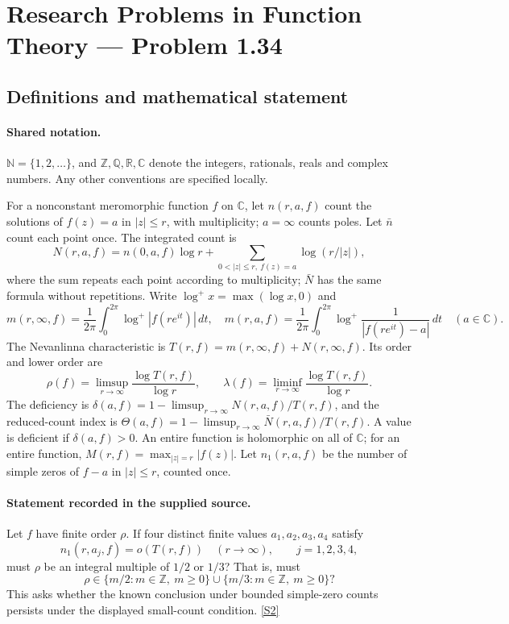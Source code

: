 \documentclass[11pt]{article}
\newcommand{\sref}[2]{\hyperlink{source:#1:#2}{[S#2]}}
\begin{document}
\section{Research Problems in Function Theory — Problem 1.34}\label{statement}

\subsection{Definitions and mathematical statement}

\paragraph{Shared notation.}$\mathbb N=\{1,2,\ldots\}$, and $\mathbb Z,\mathbb Q,\mathbb R,\mathbb C$ denote the integers, rationals, reals and complex numbers. Any other conventions are specified locally.


For a nonconstant meromorphic function $f$ on $\mathbb C$, let $n(r,a,f)$ count the solutions of $f(z)=a$ in $|z|\le r$, with multiplicity; $a=\infty$ counts poles. Let $\bar n$ count each point once. The integrated count is
\[
 N(r,a,f)=n(0,a,f)\log r+\sum_{0<|z|\le r,\ f(z)=a}\log(r/|z|),
\]
where the sum repeats each point according to multiplicity; $\bar N$ has the same formula without repetitions. Write $\log^+x=\max(\log x,0)$ and
\[
 m(r,\infty,f)=\frac1{2\pi}\int_0^{2\pi}\log^+|f(re^{it})|\,dt,\quad
 m(r,a,f)=\frac1{2\pi}\int_0^{2\pi}\log^+\frac1{|f(re^{it})-a|}\,dt\quad(a\in\mathbb C).
\]
The Nevanlinna characteristic is $T(r,f)=m(r,\infty,f)+N(r,\infty,f)$. Its order and lower order are
\[
 \rho(f)=\limsup_{r\to\infty}\frac{\log T(r,f)}{\log r},\qquad
 \lambda(f)=\liminf_{r\to\infty}\frac{\log T(r,f)}{\log r}.
\]
The deficiency is $\delta(a,f)=1-\limsup_{r\to\infty}N(r,a,f)/T(r,f)$, and the reduced-count index is $\Theta(a,f)=1-\limsup_{r\to\infty}\bar N(r,a,f)/T(r,f)$. A value is deficient if $\delta(a,f)>0$. An entire function is holomorphic on all of $\mathbb C$; for an entire function, $M(r,f)=\max_{|z|=r}|f(z)|$. Let $n_1(r,a,f)$ be the number of simple zeros of $f-a$ in $|z|\le r$, counted once.
\paragraph{Statement recorded in the supplied source.}
Let $f$ have finite order $\rho$. If four distinct finite values $a_1,a_2,a_3,a_4$ satisfy
\[
 n_1(r,a_j,f)=o(T(r,f))\quad(r\to\infty),\qquad j=1,2,3,4,
\]
must $\rho$ be an integral multiple of $1/2$ or $1/3$? That is, must
\[
 \rho\in\{m/2:m\in\mathbb Z,\ m\ge0\}\cup\{m/3:m\in\mathbb Z,\ m\ge0\}?
\]
This asks whether the known conclusion under bounded simple-zero counts persists under the displayed small-count condition. \sref{statement}{2}
\end{document}

